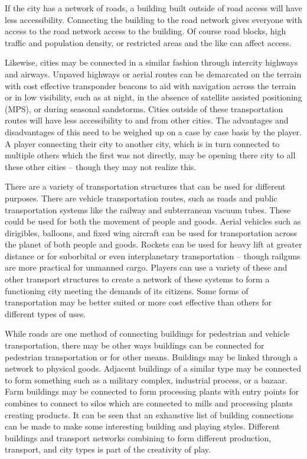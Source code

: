 If the city has a network of roads, a building built outside of road access will have less accessibility. Connecting the building to the road network gives everyone with access to the road network access to the building. Of course road blocks, high traffic and population density, or restricted areas and the like can affect access. 

Likewise, cities may be connected in a similar fashion through intercity highways and airways. Unpaved highways or aerial routes can be demarcated on the terrain with cost effective transponder beacons to aid with navigation across the terrain or in low visibility, such as at night, in the absence of satellite assisted positioning (MPS), or during seasonal sandstorms. Cities outside of these transportation routes will have less accessibility to and from other cities. The advantages and disadvantages of this need to be weighed up on a case by case basis by the player. A player connecting their city to another city, which is in turn connected to multiple others which the first was not directly, may be opening there city to all these other cities -- though they may not realize this.

There are a variety of transportation structures that can be used for different purposes. There are vehicle transportation routes, such as roads and public transportation systems like the railway and subterranean vacuum tubes. These could be used for both the movement of people and goods. Aerial vehicles such as dirigibles, balloons, and fixed wing aircraft can be used for transportation across the planet of both people and goods. Rockets can be used for heavy lift at greater distance or for suborbital or even interplanetary transportation -- though railguns are more practical for unmanned cargo. Players can use a variety of these and other transport structures to create a network of these systems to form a functioning city meeting the demands of its citizens. Some forms of transportation may be better suited or more cost effective than others for different types of uses. 

While roads are one method of connecting buildings for pedestrian and vehicle transportation, there may be other ways buildings can be connected for pedestrian transportation or for other means. Buildings may be linked through a network to physical goods. Adjacent buildings of a similar type may be connected to form something such as a military complex, industrial process, or a bazaar. Farm buildings may be connected to form processing plants with entry points for combines to connect to silos which are connected to mills and processing plants creating products. It can be seen that an exhaustive list of building connections can be made to make some interesting building and playing styles. Different buildings and transport networks combining to form different production, transport, and city types is part of the creativity of play.


